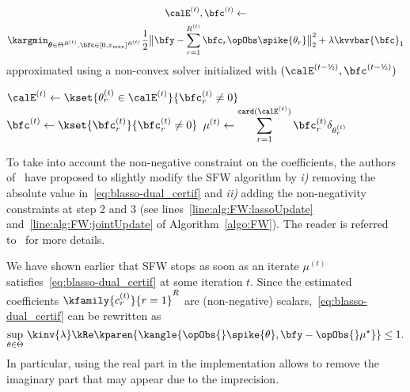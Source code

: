 \begin{algorithm}
{        \myspace
		{
		\setlength{\abovedisplayskip}{-1.5em}
		\begin{multline*}
		\ThetaIt{t},\vcoeffIt{t} \leftarrow \\ \kargmin_{\boldsymbol{\theta}\in\Theta^{R^{(t)}},\bfc\in[0, x_{\max}]^{R^{(t)}}} \frac{1}{2} \big\Vert{\bfy - \sum_{r=1}^{R^{(t)}} \bfc_r \opObs\spike{\theta_r}}\big\Vert_2^2 + \lambda\kvvbar{\bfc}_1
		\end{multline*}
		approximated using a non-convex solver initialized with $(\ThetaIt{t-\text{\textonehalf}},\bfc^{(t-\text{\textonehalf})})$
		\label{line:alg:FW:jointUpdate} \;
        }

        \myspace
		$\ThetaIt{t}\leftarrow \kset{\thetaIt{t}_r\in\ThetaIt{t}}{\vcoeffIt{t}_r\neq0}$ \;
		$\vcoeffIt{t} \leftarrow \kset{\vcoeffIt{t}_r}{\vcoeffIt{t}_r\neq0}$ \;
		$\displaystyle\muIt{t} \leftarrow \sum_{r=1}^{\texttt{card}(\ThetaIt{t})} \vcoeffIt{t}_r \delta_{\thetaIt{t}_r}$ \;
	}
\end{algorithm}


To take into account the non-negative constraint on the coefficients, the authors of~ have proposed to slightly modify the SFW algorithm by \textit{i)} removing the absolute value in~\eqref{eq:blasso-dual_certif} and \textit{ii)} adding the non-negativity constraints at step 2 and 3 (see lines~\ref{line:alg:FW:lassoUpdate} and~\ref{line:alg:FW:jointUpdate} of Algorithm~\ref{algo:FW}).
The reader is referred to~ for more details.

We have shown earlier that SFW stops as soon as an iterate $\mu^{(t)}$ satisfies~\eqref{eq:blasso-dual_certif} at some iteration $t$.
Since the estimated coefficients $\kfamily{c_r^{(t)}}{r=1}^R$ are (non-negative) scalars,~\eqref{eq:blasso-dual_certif} can be rewritten as
\begin{equation}
	\sup_{\theta\in\Theta} \, \kinv{\lambda}\kRe\kparen{\kangle{
		\opObs{}\spike{\theta}, \bfy - \opObs{}\mu^\star
	}}
	\leq 1
	.
\end{equation}
In particular, using the real part in the implementation allows to remove the imaginary part that may appear due to the imprecision.


